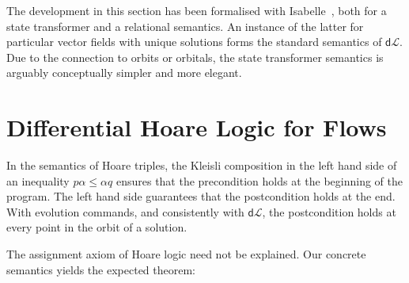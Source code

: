 \documentclass[envcountsame,envcountsect]{llncs}
\newcommand{\dL}{\mathsf{d}\mathcal{L}}
\newcommand{\Pow}{\mathcal{P}}
\newcommand{\reals}{\mathbb{R}}
\begin{document}

The development in this section has been formalised with
Isabelle~\cite{afp:hybrid}, both for a state transformer and a
relational semantics. An instance of the latter for particular vector
fields with unique solutions forms the standard semantics of
$\dL$. Due to the connection to orbits or orbitals, the state
transformer semantics is arguably conceptually simpler and more
elegant.



\section{Differential Hoare Logic for Flows}\label{sec:hoare-flow}

In the semantics of Hoare triples, the Kleisli composition in the left
hand side of an inequality $p\alpha\le \alpha q$ ensures that the
precondition holds at the beginning of the program. The left hand side
guarantees that the postcondition holds at the end. With evolution
commands, and consistently with $\dL$, the postcondition holds at
every point in the orbit of a solution.

The assignment axiom of Hoare logic need not be explained. Our concrete
semantics yields the expected theorem:
\end{document}
